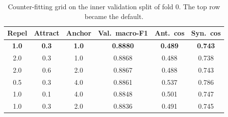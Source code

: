 \begin{table}[H]
\centering
\small
\caption{Counter-fitting grid on the inner validation split of fold 0. The top row became the default.}
\label{tab:w2vtune}
\begin{tabular}{cccccc}
\toprule
Repel & Attract & Anchor & Val.\ macro-F1 & Ant.\ cos & Syn.\ cos \\
\midrule
\textbf{1.0} & \textbf{0.3} & \textbf{1.0} & \textbf{0.8880} & \textbf{0.489} & \textbf{0.743} \\
2.0 & 0.3 & 1.0 & 0.8868 & 0.488 & 0.738 \\
2.0 & 0.6 & 2.0 & 0.8867 & 0.488 & 0.743 \\
0.5 & 0.3 & 4.0 & 0.8861 & 0.537 & 0.786 \\
1.0 & 0.1 & 4.0 & 0.8848 & 0.501 & 0.747 \\
1.0 & 0.3 & 2.0 & 0.8836 & 0.491 & 0.745 \\
\bottomrule
\end{tabular}
\end{table}